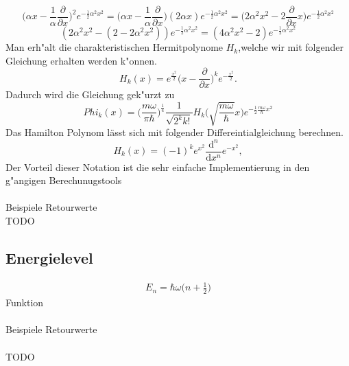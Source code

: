 \begin{refsection}
\begin{equation}
\biggl(\alpha x-\frac1{\alpha}\frac{\partial}{\partial x}\biggr)^2
e^{-\frac12\alpha^2x^2}
=
\biggl(\alpha x-\frac1{\alpha}\frac{\partial}{\partial x}\biggr)
(2\alpha x)e^{-\frac12\alpha^2x^2}
=
\biggl(2\alpha^2 x^2-2\frac{\partial}{\partial x}x\biggr)
e^{-\frac12\alpha^2x^2}
\end{equation}
\begin{equation}
(2\alpha^2x^2-(2-2\alpha^2x^2))e^{-\frac12\alpha^2x^2}
=
(4\alpha^2x^2-2)e^{-\frac12\alpha^2x^2}
\end{equation}
Man erh"alt die charakteristischen Hermitpolynome $H_k$,welche wir mit folgender
Gleichung erhalten werden k"onnen.
\begin{equation}
H_k(x)
=
e^{\frac{x^2}2}\biggl(x-\frac{\partial}{\partial x}\biggr)^k
e^{-\frac{x^2}2}.
\end{equation}
Dadurch wird die Gleichung gek"urzt zu
\begin{equation}
Phi_k(x)
=
\biggl(\frac{m\omega}{\pi\hbar}\biggr)^\frac14
\frac1{\sqrt{2^k k!}}H_k\biggl(\sqrt{\frac{m\omega}\hbar}x\biggr)
e^{-\frac12\frac{m\omega}{\hbar}x^2}
\end{equation}
Das Hamilton Polynom lässt sich mit folgender Differeintialgleichung berechnen.
\begin{equation}
H_k(x)
=
(-1)^k e^{x^2}\frac{\mathrm d^n}{\mathrm d x^n}
e^{-x^2},
\end{equation}
Der Vorteil dieser Notation ist die sehr einfache Implementierung in den g"angigen
Berechunugstools\\
\\
Beispiele Retourwerte\\
TODO

\subsection{Energielevel}
\begin{align*}
E_n
=
\hbar\omega\biggl(n+\frac12\biggr)
\end{align*}
Funktion\\
\\
Beispiele Retourwerte\\
\\
TODO


\end{refsection}
